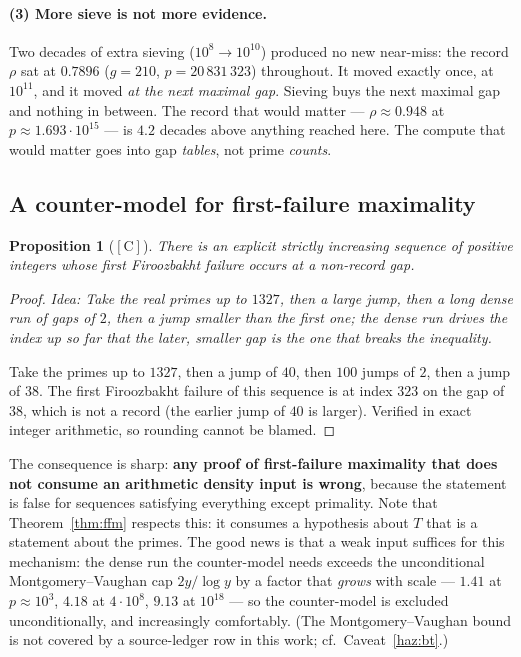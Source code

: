 \documentclass[11pt,a4paper]{article}
\theoremstyle{plain}
\newtheorem{proposition}[theorem]{Proposition}
\theoremstyle{definition}
\theoremstyle{remark}
\newcommand{\idea}[1]{\emph{Idea: #1}\par\smallskip}
\newcommand{\cC}{{[\mathrm{C}]}}
\begin{document}
\paragraph{(3) More sieve is not more evidence.}
Two decades of extra sieving ($10^8 \to 10^{10}$) produced no new near-miss: the record
$\rho$ sat at $0.7896$ ($g = 210$, $p = 20\,831\,323$) throughout. It moved exactly once, at
$10^{11}$, and it moved \emph{at the next maximal gap}. Sieving buys the next maximal gap and
nothing in between. The record that would matter --- $\rho \approx 0.948$ at
$p \approx 1.693\cdot10^{15}$ \cite{oeisA111943} --- is $4.2$ decades above anything reached
here. The compute that would matter goes into gap \emph{tables}, not prime \emph{counts}.

\subsection{A counter-model for first-failure maximality}
\label{sec:ffm-counter}

\begin{proposition}[$\cC$]
\label{prop:ffm}
There is an explicit strictly increasing sequence of positive integers whose first
Firoozbakht failure occurs at a non-record gap.
\end{proposition}

\begin{proof}
\idea{Take the real primes up to $1327$, then a large jump, then a long dense run of gaps of
$2$, then a jump smaller than the first one; the dense run drives the index up so far that
the later, smaller gap is the one that breaks the inequality.}
Take the primes up to $1327$, then a jump of $40$, then $100$ jumps of $2$, then a jump of
$38$. The first Firoozbakht failure of this sequence is at index $323$ on the gap of $38$,
which is not a record (the earlier jump of $40$ is larger). Verified in exact integer
arithmetic, so rounding cannot be blamed.
\end{proof}

The consequence is sharp: \textbf{any proof of first-failure maximality that does not consume
an arithmetic density input is wrong}, because the statement is false for sequences satisfying
everything except primality. Note that Theorem~\ref{thm:ffm} respects this: it consumes a
hypothesis about $T$ that is a statement about the primes. The good news is that a weak input
suffices for this mechanism: the dense run the counter-model needs exceeds the unconditional
Montgomery--Vaughan cap $2y/\log y$ by a factor that \emph{grows} with scale --- $1.41$ at
$p \approx 10^3$, $4.18$ at $4\cdot10^8$, $9.13$ at $10^{18}$ --- so the counter-model is
excluded unconditionally, and increasingly comfortably. (The Montgomery--Vaughan bound is not
covered by a source-ledger row in this work; cf.\ Caveat~\ref{haz:bt}.)
\end{document}
